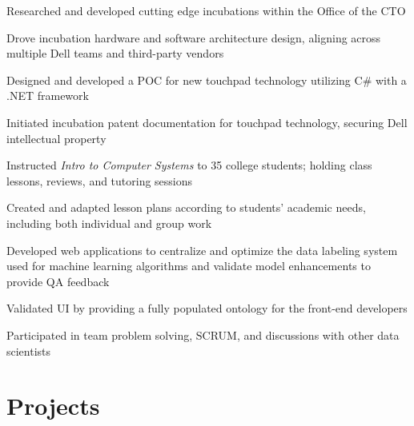 \documentclass[]{resume-openfont}
\begin{document}
\begin{minipage}[t]{1\textwidth}
\vspace{-2 mm}
\begin{tightemize}
\item Researched and developed cutting edge incubations within the Office of the CTO
\item Drove incubation hardware and software architecture design, aligning across multiple Dell teams and third-party vendors
\item Designed and developed a POC for new touchpad technology utilizing C\# with a .NET framework
\item Initiated incubation patent documentation for touchpad technology, securing Dell intellectual property
\end{tightemize}
\sectionsep

\vspace{-2 mm}
\begin{tightemize}
\item Instructed {\it Intro to Computer Systems} to 35 college students; holding class lessons, reviews, and tutoring sessions
\item Created and adapted lesson plans according to students' academic needs, including both individual and group work
\end{tightemize}
\sectionsep

\vspace{-2 mm}
\begin{tightemize}
\item Developed web applications to centralize and optimize the data labeling system used for machine learning algorithms and validate model enhancements to provide QA feedback
\item Validated UI by providing a fully populated ontology for the front-end developers
\item Participated in team problem solving, SCRUM, and discussions with other data scientists
\end{tightemize}
\sectionsep

\vspace{-4 mm}
\section{Projects}
\titlerule
\vspace{2.5 mm}


\end{minipage}
\end{document}
